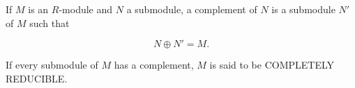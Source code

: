 If $M$ is an $R$-module and $N$ a submodule, a complement of $N$ is a submodule $N'$ of $M$ such that

$$N \oplus N' = M.$$

If every submodule of $M$ has a complement, $M$ is said to be COMPLETELY REDUCIBLE.
